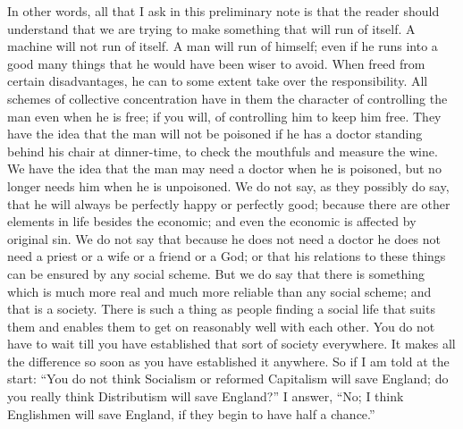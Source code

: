 \documentclass{book}
\begin{document}
In other words, all that I ask in this preliminary note is that the reader should understand that we are trying to make something that will run of itself. A machine will not run of itself. A man will run of himself; even if he runs into a good many things that he would have been wiser to avoid. When freed from certain disadvantages, he can to some extent take over the responsibility. All schemes of collective concentration have in them the character of controlling the man even when he is free; if you will, of controlling him to keep him free. They have the idea that the man will not be poisoned if he has a doctor standing behind his chair at dinner-time, to check the mouthfuls and measure the wine. We have the idea that the man may need a doctor when he is poisoned, but no longer needs him when he is unpoisoned. We do not say, as they possibly do say, that he will always be perfectly happy or perfectly good; because there are other elements in life besides the economic; and even the economic is affected by original sin. We do not say that because he does not need a doctor he does not need a priest or a wife or a friend or a God; or that his relations to these things can be ensured by any social scheme. But we do say that there is something which is much more real and much more reliable than any social scheme; and that is a society. There is such a thing as people finding a social life that suits them and enables them to get on reasonably well with each other. You do not have to wait till you have established that sort of society everywhere. It makes all the difference so soon as you have established it anywhere. So if I am told at the start: “You do not think Socialism or reformed Capitalism will save England; do you really think Distributism will save England?” I answer, “No; I think Englishmen will save England, if they begin to have half a chance.”
\end{document}
